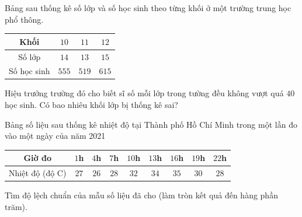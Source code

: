 \begin{ex}%
	Bảng sau thống kê số lớp và số học sinh theo từng khối ở một trường trung học phổ thông.
	\begin{center}
		\begin{tabular}{|c|c|c|c|}
		\hline
		Khối 		& $10$ & $11$ & $12$\\
		\hline
		Số lớp		& $14$ & $13$ & $15$\\
		\hline
		Số học sinh & $555$ & $519$ & $615$\\
		\hline
	\end{tabular}
	\end{center}
	Hiệu trưởng trường đó cho biết sĩ số mỗi lớp trong tường đều không vượt quá $40$ học sinh. Có bao nhiêu khối lớp bị thống kê sai?
\end{ex}

\begin{ex}%
	Bảng số liệu sau thống kê nhiệt độ tại Thành phố Hồ Chí Minh trong một lần đo vào một ngày của năm 2021 
	\begin{center}
		\begin{tabular}{|c|c|c|c|c|c|c|c|c|}
	\hline
	Giờ đo			& $1$h & $4$h & $7$h & $10$h & $13$h & $16$h & $19$h & $22$h \\
	\hline
	Nhiệt độ (độ C)	& $27$ & $26$ & $28$ & $32$ & $34$ & $35$ & $30$ & $28$ \\
	\hline
	\end{tabular}
	\end{center}
	Tìm độ lệch chuẩn của mẫu số liệu đã cho (làm tròn kết quả đến hàng phần trăm).
\end{ex}
